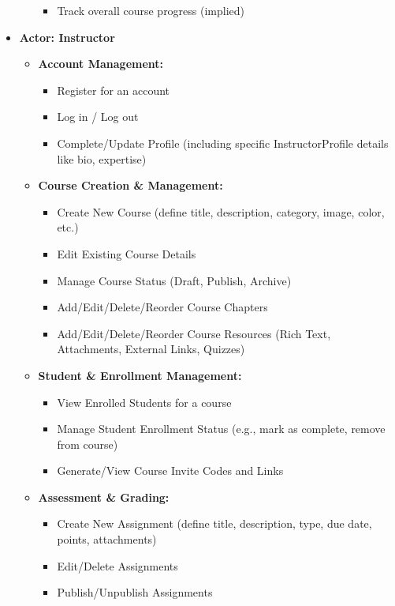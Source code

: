 \begin{itemize}
\begin{itemize}
\begin{itemize}
            \item Track overall course progress (implied)
        \end{itemize}
    \end{itemize}
    \item \textbf{Actor: Instructor}
    \begin{itemize}
        \item \textbf{Account Management:}
        \begin{itemize}
            \item Register for an account
            \item Log in / Log out
            \item Complete/Update Profile (including specific InstructorProfile details like bio, expertise)
        \end{itemize}
        \item \textbf{Course Creation \& Management:}
        \begin{itemize}
            \item Create New Course (define title, description, category, image, color, etc.)
            \item Edit Existing Course Details
            \item Manage Course Status (Draft, Publish, Archive)
            \item Add/Edit/Delete/Reorder Course Chapters
            \item Add/Edit/Delete/Reorder Course Resources (Rich Text, Attachments, External Links, Quizzes)
        \end{itemize}
        \item \textbf{Student \& Enrollment Management:}
        \begin{itemize}
            \item View Enrolled Students for a course
            \item Manage Student Enrollment Status (e.g., mark as complete, remove from course)
            \item Generate/View Course Invite Codes and Links
        \end{itemize}
        \item \textbf{Assessment \& Grading:}
        \begin{itemize}
            \item Create New Assignment (define title, description, type, due date, points, attachments)
            \item Edit/Delete Assignments
            \item Publish/Unpublish Assignments

\end{itemize}
\end{itemize}
\end{itemize}

